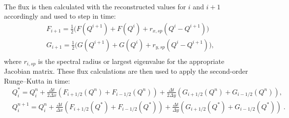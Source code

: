 \documentclass[mca,article,submit,moreauthors,pdftex]{Definitions/mdpi}
\def\oldCPU{Intel Skylake Silver 4114} %
\def\oldGPU{GeForce GTX 1080 Ti}
\def\newCPU{Intel E5-2698v4} %
\def\newGPU{Tesla V100-DGXS-32GB}
\begin{document}
\begin{paracol}{2}
\begin{align*}
\end{align*}
The flux is then calculated with the reconstructed values for $i$ and $i+1$ accordingly and used to step in time:
\begin{align*}
    &F_{i+1} = \frac{1}{2}\big( F(Q^{i+1})+F(Q^{i})+r_{x,sp}(Q^{i}-Q^{i+1})\big)\\
    &G_{i+1} = \frac{1}{2}\big( G(Q^{i+1})+G(Q^{i})+r_{y,sp}(Q^{i}-Q^{i+1})\big),\\
\end{align*}
where $r_{i,sp}$ is the spectral radius or largest eigenvalue for the appropriate Jacobian matrix. 
These flux calculations are then used to apply the second-order Runge--Kutta in time:
\begin{align*}
    &Q_i^{*} = Q_i^{n}+\frac{\Delta t}{2\Delta x}(F_{i+1/2}(Q^n)+F_{i-1/2}(Q^n))+\frac{\Delta t}{2\Delta y}(G_{i+1/2}(Q^n)+G_{i-1/2}(Q^n)),\\
    &Q_i^{n+1} = Q_i^{n}+\frac{\Delta t}{\Delta x}(F_{i+1/2}(Q^*)+F_{i-1/2}(Q^*))+\frac{\Delta t}{\Delta y}(G_{i+1/2}(Q^*)+G_{i-1/2}(Q^*)) \;.
\end{align*}




\end{paracol}
\end{document}
